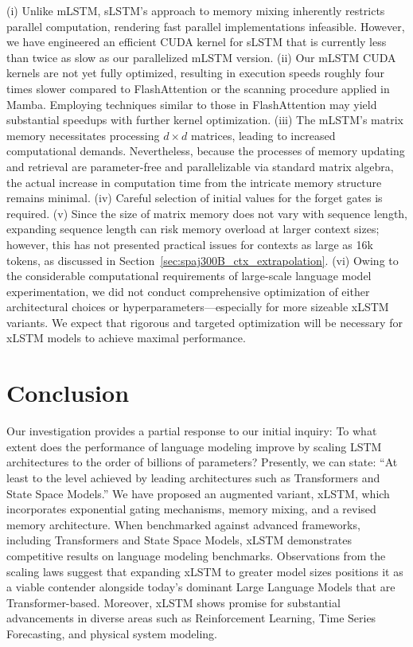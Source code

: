 (i) Unlike mLSTM, sLSTM’s approach to memory mixing inherently restricts parallel computation, rendering fast parallel implementations infeasible. However, we have engineered an efficient CUDA kernel for sLSTM that is currently less than twice as slow as our parallelized mLSTM version. (ii) Our mLSTM CUDA kernels are not yet fully optimized, resulting in execution speeds roughly four times slower compared to FlashAttention or the scanning procedure applied in Mamba. Employing techniques similar to those in FlashAttention may yield substantial speedups with further kernel optimization. (iii) The mLSTM’s matrix memory necessitates processing $d \times d$ matrices, leading to increased computational demands. Nevertheless, because the processes of memory updating and retrieval are parameter-free and parallelizable via standard matrix algebra, the actual increase in computation time from the intricate memory structure remains minimal. (iv) Careful selection of initial values for the forget gates is required. (v) Since the size of matrix memory does not vary with sequence length, expanding sequence length can risk memory overload at larger context sizes; however, this has not presented practical issues for contexts as large as 16k tokens, as discussed in Section~\ref{sec:spaj300B_ctx_extrapolation}. (vi) Owing to the considerable computational requirements of large-scale language model experimentation, we did not conduct comprehensive optimization of either architectural choices or hyperparameters—especially for more sizeable xLSTM variants. We expect that rigorous and targeted optimization will be necessary for xLSTM models to achieve maximal performance.

\section{Conclusion}
Our investigation provides a partial response to our initial inquiry: To what extent does the performance of language modeling improve by scaling LSTM architectures to the order of billions of parameters? Presently, we can state: ``At least to the level achieved by leading architectures such as Transformers and State Space Models.'' We have proposed an augmented variant, xLSTM, which incorporates exponential gating mechanisms, memory mixing, and a revised memory architecture. When benchmarked against advanced frameworks, including Transformers and State Space Models, xLSTM demonstrates competitive results on language modeling benchmarks. Observations from the scaling laws suggest that expanding xLSTM to greater model sizes positions it as a viable contender alongside today's dominant Large Language Models that are Transformer-based. Moreover, xLSTM shows promise for substantial advancements in diverse areas such as Reinforcement Learning, Time Series Forecasting, and physical system modeling.


